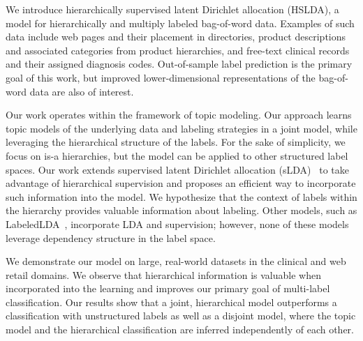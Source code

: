 

We introduce hierarchically supervised latent Dirichlet allocation (HSLDA), a
model for hierarchically and multiply labeled bag-of-word data.  Examples of
such data include web pages and their placement in directories, product
descriptions and associated categories from product hierarchies, and free-text
clinical records and their assigned diagnosis codes. Out-of-sample label
prediction is the primary goal of this work, but improved lower-dimensional
representations of the bag-of-word data are also of interest.

Our work operates within the framework of topic modeling. Our approach learns
topic models of the underlying data and labeling strategies in a joint model,
while leveraging the hierarchical structure of the labels. For the sake of
simplicity, we focus on is-a hierarchies, but the model can be
applied to other structured label spaces. Our work extends supervised latent Dirichlet
allocation (sLDA)~\cite{BleiMcAuliffe2008} to take advantage of hierarchical
supervision and proposes an efficient way to incorporate such information into the model. 
We hypothesize that the context of labels within
the hierarchy provides valuable information about labeling. Other models, such as LabeledLDA~\citep{Ramage2009}, incorporate LDA and supervision; however, none of these models leverage dependency structure in the label space.

We demonstrate our model on large, real-world datasets in the clinical and web
retail domains. We observe that hierarchical information is valuable when
incorporated into the learning and improves our primary goal of multi-label
classification. Our results show that a joint, hierarchical model outperforms a
classification with unstructured labels as well as a disjoint model, where the
topic model and the hierarchical classification are inferred
independently of each other. 

